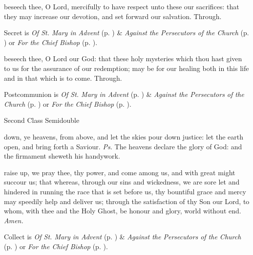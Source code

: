 \secret
{} beseech thee, O Lord, mercifully to have respect unto these our sacrifices: that they may increase our devotion, and set forward our salvation. Through.
\begin{rubric}
     Secret is \emph{Of St. Mary in Advent} (p. \pageref{SPMaryInAdvent}) \&  \emph{Against the Persecutors of the Church} (p. \pageref{SPAgainst}) or \emph{For the Chief Bishop} (p. \pageref{SPChiefBishop}).
\end{rubric}
\postcommunion
{} beseech thee, O Lord our God: that these holy mysteries which thou hast given to us for the assurance of our redemption; may be for our healing both in this life and in that which is to come. Through.
\begin{rubric}
     Postcommunion is \emph{Of St. Mary in Advent} (p. \pageref{SPMaryInAdvent}) \&  \emph{Against the Persecutors of the Church} (p. \pageref{SPAgainst}) or \emph{For the Chief Bishop} (p. \pageref{SPChiefBishop}).
\end{rubric}

\begin{inhead}
{Second Class Semidouble}
\end{inhead}
\fancyhead[RE,LO]{}
\par\noindent
{}

\properantiphonfix

\introit
{} down, ye heavens, from above, and let the skies pour down justice: let the earth open, and bring forth a Saviour. \textit{Ps.} The heavens declare the glory of God: and the firmament sheweth his handywork.

\collect
{} raise up, we pray thee, thy power, and come among us, and with great might succour us; that whereas, through our sins and wickedness, we are sore let and hindered in running the race that is set before us, thy bountiful grace and mercy may speedily help and deliver us; through the satisfaction of thy Son our Lord, to whom, with thee and the Holy Ghost, be honour and glory, world without end. \textit{Amen.}
\begin{rubric}
     Collect is \emph{Of St. Mary in Advent} (p. \pageref{SPMaryInAdvent}) \&  \emph{Against the Persecutors of the Church} (p. \pageref{SPAgainst}) or \emph{For the Chief Bishop} (p. \pageref{SPChiefBishop}).
\end{rubric}

